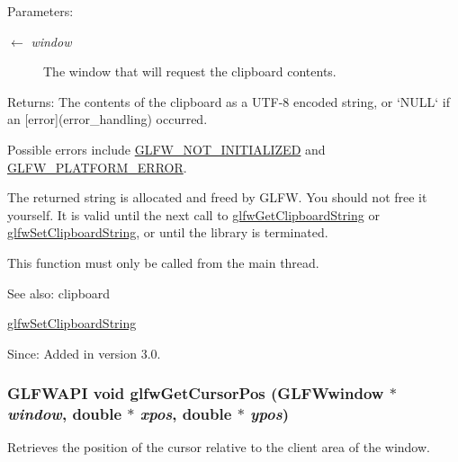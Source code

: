 \begin{Desc}
\item[Parameters:]
\begin{description}
\item[\mbox{$\leftarrow$} {\em window}]The window that will request the clipboard contents. \end{description}
\end{Desc}
\begin{Desc}
\item[Returns:]The contents of the clipboard as a UTF-8 encoded string, or `NULL` if an \mbox{[}error\mbox{]}(error\_\-handling) occurred.\end{Desc}
Possible errors include \hyperlink{group__errors_g2374ee02c177f12e1fa76ff3ed15e14a}{GLFW\_\-NOT\_\-INITIALIZED} and \hyperlink{group__errors_gd44162d78100ea5e87cdd38426b8c7a1}{GLFW\_\-PLATFORM\_\-ERROR}.

The returned string is allocated and freed by GLFW. You should not free it yourself. It is valid until the next call to \hyperlink{group__input_g3ac90c8bbaf0b46063bb02b574f3b6f7}{glfwGetClipboardString} or \hyperlink{group__input_g7a580309bbc185a0459c3559021d2fd7}{glfwSetClipboardString}, or until the library is terminated.

This function must only be called from the main thread.

\begin{Desc}
\item[See also:]clipboard 

\hyperlink{group__input_g7a580309bbc185a0459c3559021d2fd7}{glfwSetClipboardString}\end{Desc}
\begin{Desc}
\item[Since:]Added in version 3.0. \end{Desc}
\hypertarget{group__input_gd289438eb7cf53d11eca685373f44105}{
\subsubsection[glfwGetCursorPos]{\setlength{\rightskip}{0pt plus 5cm}GLFWAPI void glfwGetCursorPos ({\bf GLFWwindow} $\ast$ {\em window}, \/  double $\ast$ {\em xpos}, \/  double $\ast$ {\em ypos})}}
\label{group__input_gd289438eb7cf53d11eca685373f44105}


Retrieves the position of the cursor relative to the client area of the window. 

